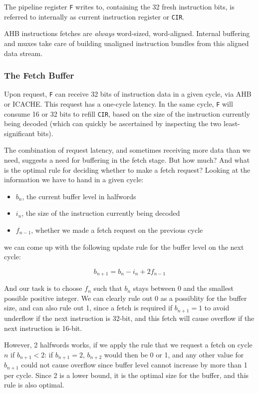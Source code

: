 \documentclass{article}
\begin{document}
The pipeline register \texttt{F} writes to, containing the 32 fresh instruction bits, is referred to internally as current instruction register or \texttt{CIR}.

AHB instructions fetches are \textit{always} word-sized, word-aligned. Internal buffering and muxes take care of building unaligned instruction bundles from this aligned data stream.

\subsubsection{The Fetch Buffer}

Upon request, \texttt{F} can receive 32 bits of instruction data in a given cycle, via AHB or ICACHE. This request has a one-cycle latency. In the same cycle, \texttt{F} will consume 16 or 32 bits to refill \texttt{CIR}, based on the size of the instruction currently being decoded (which can quickly be ascertained by inspecting the two least-significant bits).

The combination of request latency, and sometimes receiving more data than we need, suggests a need for buffering in the fetch stage. But how much? And what is the optimal rule for deciding whether to make a fetch request? Looking at the information we have to hand in a given cycle:

\begin{itemize}
	\item $b_n$, the current buffer level in halfwords
	\item $i_n$, the size of the instruction currently being decoded
	\item $f_{n-1}$, whether we made a fetch request on the previous cycle
\end{itemize}

we can come up with the following update rule for the buffer level on the next cycle:

\[ b_{n+1} = b_n - i_n + 2f_{n-1} \]

And our task is to choose $f_n$ such that $b_n$ stays between 0 and the smallest possible positive integer. We can clearly rule out 0 as a possiblity for the buffer size, and can also rule out 1, since a fetch is required if $b_{n+1} = 1$ to avoid underflow if the next instruction is 32-bit, and this fetch will cause overflow if the next instruction is 16-bit.

However, 2 halfwords works, if we apply the rule that we request a fetch on cycle $n$ if $b_{n+1} < 2$: if $b_{n+1} = 2$,  $b_{n+2}$ would then be 0 or 1, and any other value for $b_{n+1}$ could not cause overflow since buffer level cannot increase by more than 1 per cycle. Since 2 is a lower bound, it is the optimal size for the buffer, and this rule is also optimal.
\end{document}
